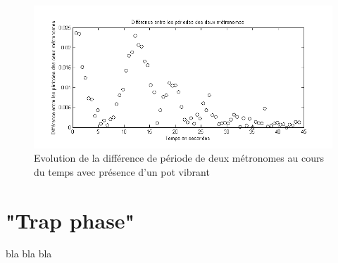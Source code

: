 \documentclass[a4paper,11pt]{report}
\begin{document}
\begin{figure}[h]
\centering
\includegraphics[width=1\textwidth]{PotVibrant_Synchro_Periode_200BPM}
\caption{Evolution de la différence de période de deux métronomes au cours du temps avec présence d'un pot vibrant}
\label{SynchroPP}
\end{figure}

\section{"Trap phase"}

bla bla bla
\end{document}
